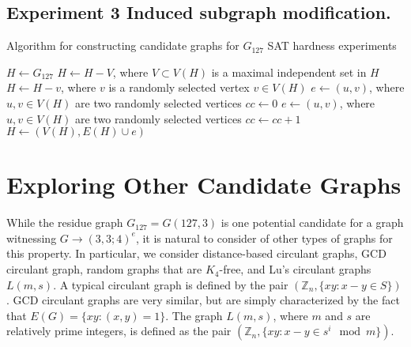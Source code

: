 \documentclass[paper=a4, fontsize=11pt]{scrartcl} %
\begin{document}

\subsection{Experiment 3 Induced subgraph modification.}



\begin{algorithm}[t] %
\caption{Algorithm for constructing candidate graphs for $G_{127}$ SAT hardness experiments} \label{alg:experimentGraphBuilder}
\begin{algorithmic}[1]
\State $H \gets G_{127}$
	\State $H \gets H - V$, where $V \subset V(H)$ is a maximal independent set in $H$
\EndFor
{}
	\State $H \gets H - v$, where $v$ is a randomly selected vertex $v \in V(H)$
\EndFor
{}
	\State $e \gets (u,v)$, where $u,v \in V(H)$ are two randomly selected vertices
	\State $cc \gets 0$
		\State $e \gets (u,v)$, where $u,v \in V(H)$ are two randomly selected vertices
		\State $cc \gets cc + 1$
	\EndWhile
	\Else
		\State $H \gets (V(H), E(H) \cup e)$
	\EndIf
\EndFor
\end{algorithmic}
\end{algorithm}


\section{Exploring Other Candidate Graphs}
While the residue graph $G_{127} = G(127,3)$ is one potential candidate for a 
graph witnessing $G \to (3,3;4)^e$, it is natural to consider of other types of
graphs for this property. In particular, we consider distance-based circulant graphs,
GCD circulant graph, random graphs that are $K_4$-free, and Lu's circulant graphs
$L(m,s)$. A typical circulant graph is defined by the pair $(\mathbb{Z}_n, \{xy : x - y \in S\})$. GCD circulant graphs are very similar, but are simply characterized
by the fact that $E(G) = \{xy : (x,y) = 1\}$. 
The graph $L(m,s)$, where $m$ and $s$ are relatively prime integers,
is defined as the pair $(\mathbb{Z}_n, \{xy : x - y \in s^i \mod m \})$.
\end{document}
